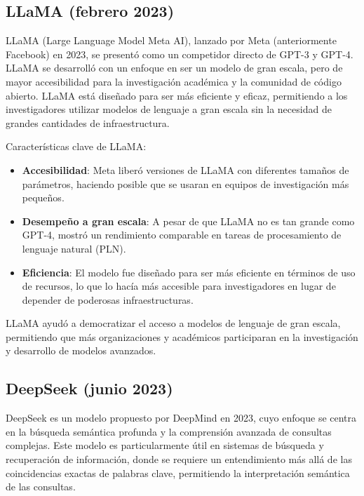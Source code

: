 
\subsection{LLaMA (febrero 2023)}

LLaMA (Large Language Model Meta AI), lanzado por Meta (anteriormente Facebook) en 2023, se presentó como un competidor directo de GPT-3 y GPT-4. 
LLaMA se desarrolló con un enfoque en ser un modelo de gran escala, pero de mayor accesibilidad para la investigación académica y la comunidad de código abierto. 
LLaMA está diseñado para ser más eficiente y eficaz, permitiendo a los investigadores utilizar modelos de lenguaje a gran escala sin la necesidad de grandes cantidades de infraestructura.

Características clave de LLaMA:
\begin{itemize}
    \item \textbf{Accesibilidad}: Meta liberó versiones de LLaMA con diferentes tamaños de parámetros, haciendo posible que se usaran en equipos de investigación más pequeños.
    \item \textbf{Desempeño a gran escala}: A pesar de que LLaMA no es tan grande como GPT-4, mostró un rendimiento comparable en tareas de procesamiento de lenguaje natural (PLN).
    \item \textbf{Eficiencia}: El modelo fue diseñado para ser más eficiente en términos de uso de recursos, lo que lo hacía más accesible para investigadores en lugar de depender de poderosas infraestructuras.
\end{itemize}

LLaMA ayudó a democratizar el acceso a modelos de lenguaje de gran escala, permitiendo que más organizaciones y académicos participaran en la investigación y desarrollo de modelos avanzados.

\subsection{DeepSeek (junio 2023)}
DeepSeek es un modelo propuesto por DeepMind en 2023, cuyo enfoque se centra en la búsqueda semántica profunda y la comprensión avanzada de consultas complejas. 
Este modelo es particularmente útil en sistemas de búsqueda y recuperación de información, donde se requiere un entendimiento más allá de las coincidencias exactas de palabras clave, permitiendo la interpretación semántica de las consultas.

